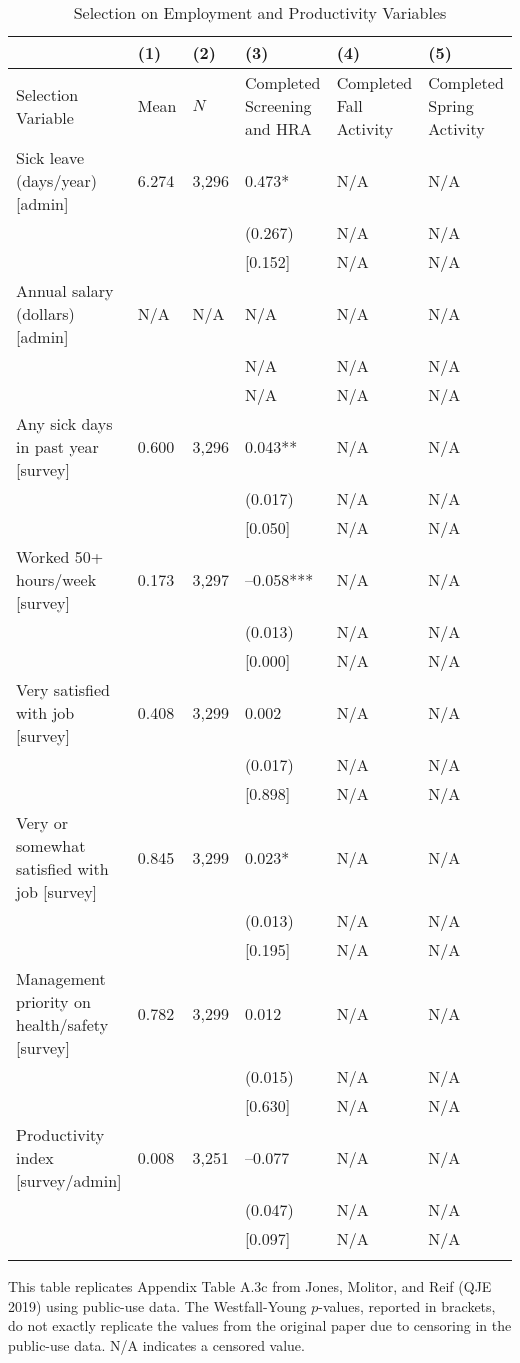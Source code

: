 \documentclass{article}
\begin{document}
\begin{table}[tbp] \centering
{}

\caption{Selection on Employment and Productivity Variables}
{\scriptsize
\begin{tabularx}{\linewidth}{lCCCCC}

\toprule
&{(1)}&{(2)}&{(3)}&{(4)}&{(5)} \tabularnewline \midrule
{Selection Variable}&{Mean}&{\(N\)}&{Completed Screening and HRA}&{Completed Fall Activity}&{Completed Spring Activity} \tabularnewline
\midrule \addlinespace[\belowrulesep]
Sick leave (days/year) [admin]&6.274&3,296&0.473*&N/A&N/A \tabularnewline
&&&(0.267)&N/A&N/A \tabularnewline
&&&[0.152]&N/A&N/A \tabularnewline
Annual salary (dollars) [admin]&N/A&N/A&N/A&N/A&N/A \tabularnewline
&&&N/A&N/A&N/A \tabularnewline
&&&N/A&N/A&N/A \tabularnewline
Any sick days in past year [survey]&0.600&3,296&0.043**&N/A&N/A \tabularnewline
&&&(0.017)&N/A&N/A \tabularnewline
&&&[0.050]&N/A&N/A \tabularnewline
Worked 50+ hours/week [survey]&0.173&3,297&--0.058***&N/A&N/A \tabularnewline
&&&(0.013)&N/A&N/A \tabularnewline
&&&[0.000]&N/A&N/A \tabularnewline
Very satisfied with job [survey]&0.408&3,299&0.002&N/A&N/A \tabularnewline
&&&(0.017)&N/A&N/A \tabularnewline
&&&[0.898]&N/A&N/A \tabularnewline
Very or somewhat satisfied with job [survey]&0.845&3,299&0.023*&N/A&N/A \tabularnewline
&&&(0.013)&N/A&N/A \tabularnewline
&&&[0.195]&N/A&N/A \tabularnewline
Management priority on health/safety [survey]&0.782&3,299&0.012&N/A&N/A \tabularnewline
&&&(0.015)&N/A&N/A \tabularnewline
&&&[0.630]&N/A&N/A \tabularnewline
Productivity index [survey/admin]&0.008&3,251&--0.077&N/A&N/A \tabularnewline
&&&(0.047)&N/A&N/A \tabularnewline
&&&[0.097]&N/A&N/A \tabularnewline
\bottomrule \addlinespace[\belowrulesep]

\end{tabularx}
\begin{flushleft}
\footnotesize This table replicates Appendix Table A.3c from Jones, Molitor, and Reif (QJE 2019) using public-use data. The Westfall-Young \(p\)-values, reported in brackets, do not exactly replicate the values from the original paper due to censoring in the public-use data. N/A indicates a censored value.
\end{flushleft}
}
\end{table}
\end{document}
